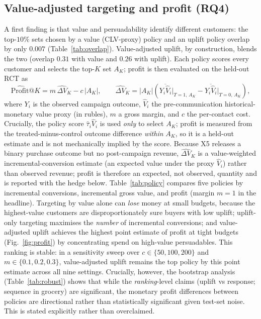 \documentclass[pdflatex,sn-mathphys-num]{sn-jnl}
\theoremstyle{thmstyleone}
\theoremstyle{thmstylethree}
\begin{document}
\subsection{Value-adjusted targeting and profit (RQ4)}\label{sec:res_policy}
A first finding is that value and persuadability identify different customers: the top-$10\%$ sets
chosen by a value (CLV-proxy) policy and an uplift policy overlap by only $0.007$
(Table~\ref{tab:overlap}). Value-adjusted uplift, by construction, blends the two (overlap $0.31$
with value and $0.26$ with uplift). Each policy scores every customer and selects the top-$K$ set
$A_K$; profit is then evaluated on the held-out RCT as
\begin{equation}
\widehat{\mathrm{Profit}}@K = m\,\widehat{\Delta V}_K - c\,|A_K|,\qquad
\widehat{\Delta V}_K = |A_K|\left(\overline{Y_i\hat V_i}\big|_{T=1,\,A_K} - \overline{Y_i\hat V_i}\big|_{T=0,\,A_K}\right),
\label{eq:profit}
\end{equation}
where $Y_i$ is the observed campaign outcome, $\hat V_i$ the pre-communication historical-monetary
value proxy (in rubles), $m$ a gross margin, and $c$ the per-contact cost. Crucially, the policy
score $\hat\tau_i\hat V_i$ is used \emph{only} to select $A_K$; profit is measured from the
treated-minus-control outcome difference \emph{within} $A_K$, so it is a held-out estimate and is
not mechanically implied by the score. Because X5 releases a binary purchase outcome but no
post-campaign revenue, $\widehat{\Delta V}_K$ is a value-weighted incremental-conversion estimate
(an expected value under the proxy $\hat V_i$) rather than observed revenue; profit is therefore an
expected, not observed, quantity and is reported with the hedge below. Table~\ref{tab:policy}
compares five policies by incremental conversions, incremental gross value, and profit (margin
$m=1$ in the headline). Targeting by value alone can \emph{lose} money at
small budgets, because the highest-value customers are disproportionately sure buyers with low
uplift; uplift-only targeting maximises the \emph{number} of incremental conversions; and
value-adjusted uplift achieves the highest point estimate of profit at tight budgets (Fig.~\ref{fig:profit})
by concentrating spend on high-value persuadables. This ranking is stable: in a sensitivity sweep
over $c\in\{50,100,200\}$ and $m\in\{0.1,0.2,0.3\}$, value-adjusted uplift remains the top policy by this point estimate across all nine settings.
Crucially, however, the bootstrap analysis (Table~\ref{tab:robust}) shows that while the
\emph{ranking}-level claims (uplift vs response; sequence in grocery) are significant, the
monetary profit differences between policies are directional rather than statistically
significant given test-set noise. This is stated explicitly rather than overclaimed.
\end{document}
